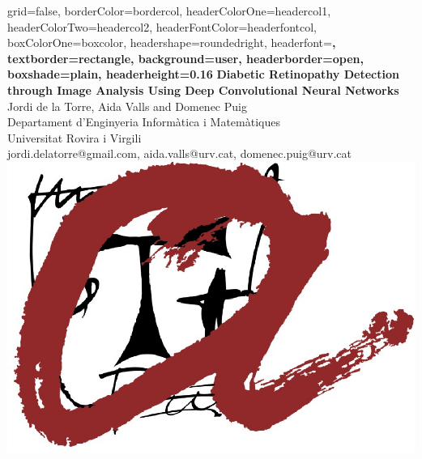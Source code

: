 \documentclass[a0paper,portrait]{baposter}
\begin{document}
\begin{poster}{
grid=false,
borderColor=bordercol, %
headerColorOne=headercol1, %
headerColorTwo=headercol2, %
headerFontColor=headerfontcol, %
boxColorOne=boxcolor, %
headershape=roundedright, %
headerfont=\Large\sf\bf, %
textborder=rectangle,
background=user,
headerborder=open, %
boxshade=plain,
headerheight=0.16\textheight
}
{}
%
%
{\sf\bf Diabetic Retinopathy Detection through Image Analysis Using Deep Convolutional Neural Networks} %
{\vspace{1em} Jordi de la Torre, Aida Valls and Domenec Puig\\ %
Departament d'Enginyeria Inform\`atica i Matem\`atiques\\
Universitat Rovira i Virgili\\
{\smaller jordi.delatorre@gmail.com, aida.valls@urv.cat, domenec.puig@urv.cat}} %
{\includegraphics[scale=0.50]{logo}} %



\end{poster}
\end{document}
